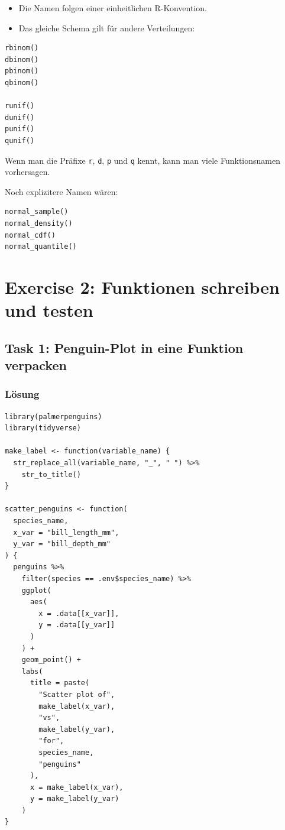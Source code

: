 \documentclass[11pt,a4paper]{ctexart}
\begin{document}
\begin{itemize}
  \item Die Namen folgen einer einheitlichen R-Konvention.
  \item Das gleiche Schema gilt für andere Verteilungen:
\end{itemize}

\begin{lstlisting}
rbinom()
dbinom()
pbinom()
qbinom()

runif()
dunif()
punif()
qunif()
\end{lstlisting}

Wenn man die Präfixe \texttt{r}, \texttt{d}, \texttt{p} und \texttt{q}
kennt, kann man viele Funktionsnamen vorhersagen.

Noch explizitere Namen wären:

\begin{lstlisting}
normal_sample()
normal_density()
normal_cdf()
normal_quantile()
\end{lstlisting}

\section{Exercise 2: Funktionen schreiben und testen}

\subsection{Task 1: Penguin-Plot in eine Funktion verpacken}

\subsubsection*{Lösung}

\begin{lstlisting}
library(palmerpenguins)
library(tidyverse)

make_label <- function(variable_name) {
  str_replace_all(variable_name, "_", " ") %>%
    str_to_title()
}

scatter_penguins <- function(
  species_name,
  x_var = "bill_length_mm",
  y_var = "bill_depth_mm"
) {
  penguins %>%
    filter(species == .env$species_name) %>%
    ggplot(
      aes(
        x = .data[[x_var]],
        y = .data[[y_var]]
      )
    ) +
    geom_point() +
    labs(
      title = paste(
        "Scatter plot of",
        make_label(x_var),
        "vs",
        make_label(y_var),
        "for",
        species_name,
        "penguins"
      ),
      x = make_label(x_var),
      y = make_label(y_var)
    )
}
\end{lstlisting}
\end{document}
